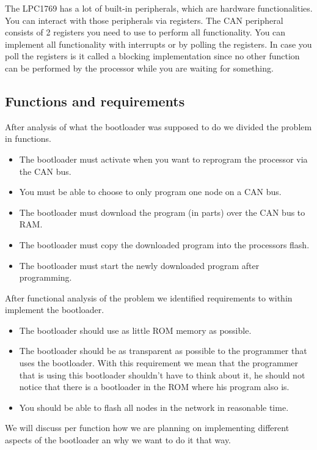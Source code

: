 \documentclass[twocolumn]{article}
\begin{document}
		The LPC1769 has a lot of built-in peripherals,
		which are hardware functionalities.
		You can interact with those peripherals via registers.
		The CAN peripheral consists of 2 registers you need to use to perform all functionality.
		You can implement all functionality with interrupts or by polling the registers.
		In case you poll the registers is it called a blocking implementation since no other function can be performed by the processor while you are waiting for something.
	
	\subsection*{Functions and requirements}
		After analysis of what the bootloader was supposed to do we divided the problem in functions.
		\begin{itemize}
			\item The bootloader must activate when you want to reprogram the processor via the CAN bus.
			\item You must be able to choose to only program one node on a CAN bus.
			\item The bootloader must download the program (in parts) over the CAN bus to RAM.
			\item The bootloader must copy the downloaded program into the processors flash.
			\item The bootloader must start the newly downloaded program after programming.
		\end{itemize}
		After functional analysis of the problem we identified requirements to within implement the bootloader.
		\begin{itemize}
			\item The bootloader should use as little ROM memory as possible.
			\item The bootloader should be as transparent as possible to the programmer that uses the bootloader. With this requirement we mean that the programmer that is using this bootloader shouldn't have to think about it, he should not notice that there is a bootloader in the ROM where his program also is.
			\item You should be able to flash all nodes in the network in reasonable time.
		\end{itemize}
		
		We will discuss per function how we are planning on implementing different aspects of the bootloader an why we want to do it that way.
	
\end{document}
